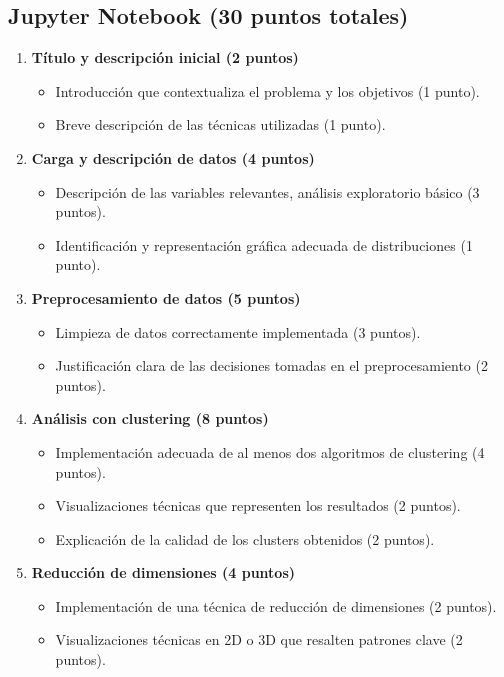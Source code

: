 \documentclass[a4,11pt]{aleph-notas}
\begin{document}
\subsection*{Jupyter Notebook (30 puntos totales)}
\begin{enumerate}[leftmargin=*,label=\textbf{\arabic*.}]
    \item \textbf{Título y descripción inicial (2 puntos)}
    \begin{itemize}[leftmargin=*]
        \item Introducción que contextualiza el problema y los objetivos (1 punto).
        \item Breve descripción de las técnicas utilizadas (1 punto).
    \end{itemize}
    
    \item \textbf{Carga y descripción de datos (4 puntos)}
    \begin{itemize}[leftmargin=*]
        \item Descripción de las variables relevantes, análisis exploratorio básico (3 puntos).
        \item Identificación y representación gráfica adecuada de distribuciones (1 punto).
    \end{itemize}
    
    \item \textbf{Preprocesamiento de datos (5 puntos)}
    \begin{itemize}[leftmargin=*]
        \item Limpieza de datos correctamente implementada (3 puntos).
        \item Justificación clara de las decisiones tomadas en el preprocesamiento (2 puntos).
    \end{itemize}
    
    \item \textbf{Análisis con clustering (8 puntos)}
    \begin{itemize}[leftmargin=*]
        \item Implementación adecuada de al menos dos algoritmos de clustering (4 puntos).
        \item Visualizaciones técnicas que representen los resultados (2 puntos).
        \item Explicación de la calidad de los clusters obtenidos (2 puntos).
    \end{itemize}
    
    \item \textbf{Reducción de dimensiones (4 puntos)}
    \begin{itemize}[leftmargin=*]
        \item Implementación de una técnica de reducción de dimensiones (2 puntos).
        \item Visualizaciones técnicas en 2D o 3D que resalten patrones clave (2 puntos).
    \end{itemize}
    

\end{enumerate}
\end{document}
